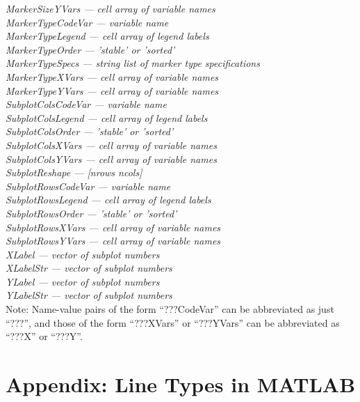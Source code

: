\documentclass{article}
\newcommand{\namevalue}[2]{{\it #1 --- #2}}
\begin{document}
\namevalue{MarkerSizeYVars}{cell array of variable names} \\
\namevalue{MarkerTypeCodeVar}{variable name} \\
\namevalue{MarkerTypeLegend}{cell array of legend labels} \\
\namevalue{MarkerTypeOrder}{'stable' or 'sorted'} \\
\namevalue{MarkerTypeSpecs}{string list of marker type specifications} \\
\namevalue{MarkerTypeXVars}{cell array of variable names} \\
\namevalue{MarkerTypeYVars}{cell array of variable names} \\
\namevalue{SubplotColsCodeVar}{variable name} \\
\namevalue{SubplotColsLegend}{cell array of legend labels} \\
\namevalue{SubplotColsOrder}{'stable' or 'sorted'} \\
\namevalue{SubplotColsXVars}{cell array of variable names} \\
\namevalue{SubplotColsYVars}{cell array of variable names} \\
\namevalue{SubplotReshape}{[nrows ncols]} \\
\namevalue{SubplotRowsCodeVar}{variable name} \\
\namevalue{SubplotRowsLegend}{cell array of legend labels} \\
\namevalue{SubplotRowsOrder}{'stable' or 'sorted'} \\
\namevalue{SubplotRowsXVars}{cell array of variable names} \\
\namevalue{SubplotRowsYVars}{cell array of variable names} \\
\namevalue{XLabel}{vector of subplot numbers} \\
\namevalue{XLabelStr}{vector of subplot numbers} \\
\namevalue{YLabel}{vector of subplot numbers} \\
\namevalue{YLabelStr}{vector of subplot numbers} \\

Note: Name-value pairs of the form ``???CodeVar'' can be abbreviated as just ``???'',
and those of the form ``???XVars'' or ``???YVars'' can be abbreviated as ``???X'' or ``???Y''.

\section{Appendix: Line Types in MATLAB}
\end{document}
